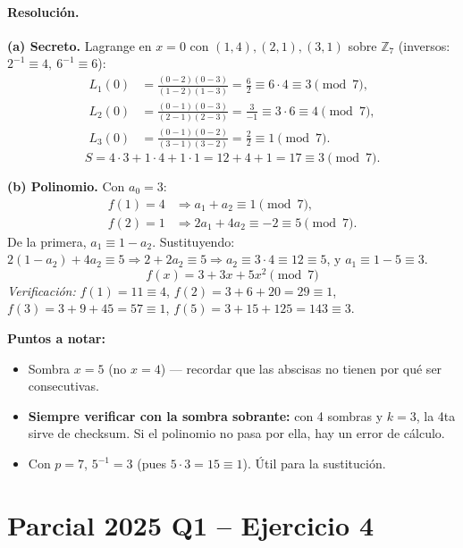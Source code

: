 \documentclass[11pt,a4paper]{article}
\begin{document}
\paragraph{Resolución.}

\textbf{(a) Secreto.} Lagrange en $x=0$ con $(1,4),(2,1),(3,1)$ sobre $\mathbb{Z}_7$ (inversos: $2^{-1}\equiv 4,\ 6^{-1}\equiv 6$):
\begin{align*}
  L_1(0) &= \frac{(0-2)(0-3)}{(1-2)(1-3)} = \frac{6}{2} \equiv 6\cdot 4 \equiv 3 \pmod 7,\\
  L_2(0) &= \frac{(0-1)(0-3)}{(2-1)(2-3)} = \frac{3}{-1} \equiv 3\cdot 6 \equiv 4 \pmod 7,\\
  L_3(0) &= \frac{(0-1)(0-2)}{(3-1)(3-2)} = \frac{2}{2} \equiv 1 \pmod 7.
\end{align*}
\[
  S = 4\cdot 3 + 1\cdot 4 + 1\cdot 1 = 12 + 4 + 1 = 17 \equiv \boxed{3} \pmod 7.
\]

\textbf{(b) Polinomio.} Con $a_0=3$:
\begin{align*}
  f(1)=4 &\Rightarrow a_1 + a_2 \equiv 1 \pmod 7,\\
  f(2)=1 &\Rightarrow 2a_1 + 4a_2 \equiv -2 \equiv 5 \pmod 7.
\end{align*}
De la primera, $a_1 \equiv 1-a_2$. Sustituyendo: $2(1-a_2)+4a_2\equiv 5 \Rightarrow 2+2a_2\equiv 5 \Rightarrow a_2\equiv 3\cdot 4\equiv 12\equiv 5$, y $a_1\equiv 1-5\equiv 3$.
\[
  \boxed{f(x) = 3 + 3x + 5x^2 \pmod 7}
\]
\emph{Verificación:} $f(1)=11\equiv4$, $f(2)=3+6+20=29\equiv1$, $f(3)=3+9+45=57\equiv1$, $f(5)=3+15+125=143\equiv3$. \checkmark

\begin{tipsbox}
\textbf{Puntos a notar:}
\begin{itemize}
  \item Sombra $x=5$ (no $x=4$) --- recordar que las abscisas no tienen por qué ser consecutivas.
  \item \textbf{Siempre verificar con la sombra sobrante:} con 4 sombras y $k=3$, la 4ta sirve de checksum. Si el polinomio no pasa por ella, hay un error de cálculo.
  \item Con $p=7$, $5^{-1}=3$ (pues $5\cdot3=15\equiv1$). Útil para la sustitución.
\end{itemize}
\end{tipsbox}

\section{Parcial 2025 Q1 -- Ejercicio 4}
\label{sec:2025Q1}
\end{document}
